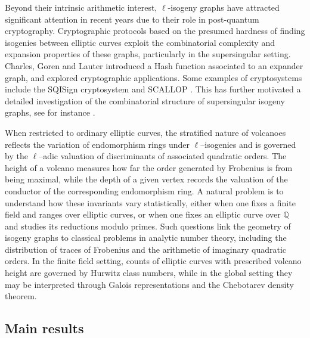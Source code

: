 \documentclass[table]{amsart}
\newcommand{\Q}{\mathbb{Q}}
\numberwithin{equation}{section}
\begin{document}
\par Beyond their intrinsic arithmetic interest, $\ell$-isogeny graphs have attracted significant attention in recent years due to their role in post-quantum cryptography. Cryptographic protocols based on the presumed hardness of finding isogenies between elliptic curves exploit the combinatorial complexity and expansion properties of these graphs, particularly in the supersingular setting. Charles, Goren and Lauter \cite{CGL} introduced a Hash function associated to an expander graph, and explored cryptographic applications. Some examples of cryptosystems include the SQISign cryptosystem \cite{crypto1} and SCALLOP \cite{crypto2}. This has further motivated a detailed investigation of the combinatorial structure of supersingular isogeny graphs, see for instance \cite{colokohel, arpinetal, orvis, cyclesandcuts}.
\par When restricted to ordinary elliptic curves, the stratified nature of volcanoes reflects the variation of endomorphism rings under $\ell$–isogenies and is governed by the $\ell$–adic valuation of discriminants of associated quadratic orders. The height of a volcano measures how far the order generated by Frobenius is from being maximal, while the depth of a given vertex records the valuation of the conductor of the corresponding endomorphism ring. A natural problem is to understand how these invariants vary statistically, either when one fixes a finite field and ranges over elliptic curves, or when one fixes an elliptic curve over $\Q$ and studies its reductions modulo primes. Such questions link the geometry of isogeny graphs to classical problems in analytic number theory, including the distribution of traces of Frobenius and the arithmetic of imaginary quadratic orders. In the finite field setting, counts of elliptic curves with prescribed volcano height are governed by Hurwitz class numbers, while in the global setting they may be interpreted through Galois representations and the Chebotarev density theorem.

\subsection{Main results}
\end{document}
